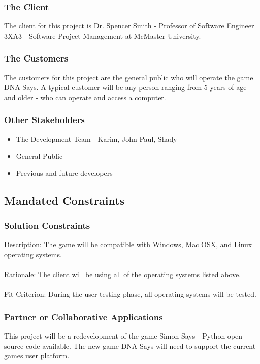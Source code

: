 \documentclass[12pt, titlepage]{article}
\begin{document}
\subsubsection{The Client}
The client for this project is Dr. Spencer Smith - Professor of Software Engineer 3XA3 - Software Project Management at McMaster University.

\subsubsection{The Customers}
The customers for this project are the general public who will operate the game DNA Says. A typical customer will be any person ranging from 5 years of age and older - who can operate and access a computer. 

\subsubsection{Other Stakeholders}
\begin{itemize}
\item The Development Team - Karim, John-Paul, Shady
\item General Public
\item Previous and future developers
\end{itemize}

\subsection{Mandated Constraints}

\subsubsection{Solution Constraints}
Description: The game will be compatible with Windows, Mac OSX, and Linux operating systems.\\
\\
Rationale: The client will be using all of the operating systems listed above.\\
\\
Fit Criterion: During the user testing phase, all operating systems will be tested.

\subsubsection{Partner or Collaborative Applications}
This project will be a redevelopment of the game Simon Says - Python open source code available. The new game DNA Says will need to support the current games user platform.
\end{document}
